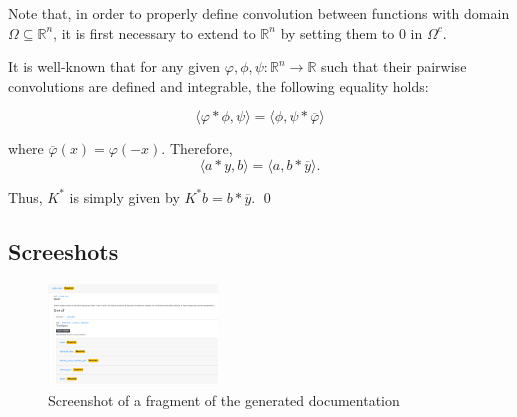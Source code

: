 \documentclass[twocolumn,twoside,a4paper,10pt]{IEEEtran}
\begin{document}
Note that, in order to properly define convolution between functions with domain \(\Omega\subseteq\mathbb{R}^n\), it is first necessary to extend to \(\mathbb{R}^n\) by setting them to \(0\) in \(\Omega^c\).

It is well-known that for any given \(\varphi, \phi, \psi\colon\mathbb{R}^n\to\mathbb{R}\) such that their pairwise convolutions are defined and integrable, the following equality holds:

\begin{equation}\label{eq:convolution/inversion}
  \langle\varphi\ast\phi, \psi\rangle = \langle\phi, \psi\ast\overline{\varphi}\rangle
\end{equation}

where \(\overline{\varphi}(x) = \varphi(-x)\). Therefore,
\[
  \langle a\ast y, b\rangle = \langle a, b\ast\overline{y} \rangle
.\]

Thus, \(K^*\) is simply given by \(K^*b = b\ast \overline{y}\). \qed

\subsection{Screeshots}
\begin{figure}[h!]\label{pic:docs}
\centering
\includegraphics[width=0.4\textwidth]{figures/config_docs2.png}
\caption{Screenshot of a fragment of the generated documentation}
\end{figure}


\end{document}
